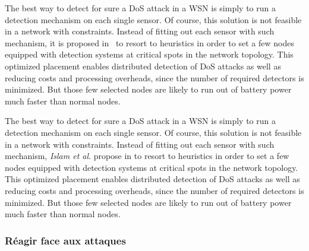 The best way to detect for sure a DoS attack in a WSN is simply to run a detection mechanism on each single sensor.
Of course, this solution is not feasible in a network with constraints.
Instead of fitting out each sensor with such mechanism, it is proposed in~\cite{INK09} to resort to heuristics in order to set a few nodes equipped with detection systems at critical spots in the network topology.
This optimized placement enables distributed detection of DoS attacks as well as reducing costs and processing overheads, since the number of required detectors is minimized.
But those few selected nodes are likely to run out of battery power much faster than normal nodes.

The best way to detect for sure a DoS attack in a WSN is simply to run a detection mechanism on each single sensor.
Of course, this solution is not feasible in a network with constraints.
Instead of fitting out each sensor with such mechanism, \textit{Islam et al}. propose in
\cite{INK09}
to resort to heuristics in order to set a few nodes equipped with detection systems at critical spots in the network topology.
This optimized placement enables distributed detection of DoS attacks as well as reducing costs and processing overheads, since the number of required detectors is minimized.
But those few selected nodes are likely to run out of battery power much faster than normal nodes.

\subsubsection{Réagir face aux attaques}

